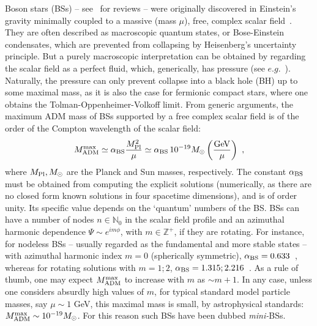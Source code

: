 Boson stars (BSs) -- see~\cite{Schunck:2003kk,Liebling:2012fv} for reviews --  were originally discovered in Einstein's gravity minimally coupled to a massive (mass $\mu$), free, complex scalar field~\cite{Kaup:1968zz,Ruffini:1969qy}. They are often described as macroscopic quantum states, or Bose-Einstein condensates, which are prevented from collapsing by Heisenberg's uncertainty principle. But a purely macroscopic interpretation can be obtained by regarding the scalar field as a perfect fluid, which, generically, has pressure (see $e.g.$~\cite{Faraoni:2012hn}). Naturally, the pressure can only prevent collapse into a black hole (BH) up to some maximal mass, as it is also the case for fermionic compact stars, where one obtains the Tolman-Oppenheimer-Volkoff limit. From generic arguments, the maximum ADM mass of BSs supported by a free complex scalar field is of the order of the Compton wavelength of the scalar field:
%
\begin{equation}
 M_{\rm ADM}^{\rm max}\simeq \alpha_{\rm BS} \frac{M_{\rm Pl}^2}{\mu}\simeq \alpha_{\rm BS} \, 10^{-19}M_\odot\left(\frac{\rm GeV}{\mu}\right)\ , 
\label{mini}
\end{equation}
 where $M_{\rm Pl},M_{\odot}$ are the Planck and Sun masses, respectively. The constant $\alpha_{\rm BS}$ must be obtained from computing the explicit solutions (numerically, as there are no closed form known solutions in four spacetime dimensions), and is of order unity. Its specific value depends on the `quantum' numbers of the BS. BSs can have a number of nodes $n\in \mathbb{N}_0$ in the scalar field profile and an azimuthal harmonic dependence $\Psi\sim e^{im\phi}$, with $m\in \mathbb{Z}^+$, if they are rotating. For instance, for nodeless BSs -- usually regarded as the fundamental and more stable states -- with azimuthal harmonic index $m=0$ (spherically symmetric), $\alpha_{\rm BS}=0.633$~\cite{Liebling:2012fv}, whereas for rotating solutions with $m=1;2$, $\alpha_{\rm BS}=1.315;2.216$~\cite{Yoshida:1997qf,Grandclement:2014msa}. As a rule of thumb, one may expect $M^{\rm max}_{\rm ADM}$  to increase with $m$ as $\sim m+1$. In any case, unless one considers absurdly high values of $m$, for typical standard model particle masses, say $\mu\sim 1$ GeV, this maximal mass is small, by astrophysical standards: $M_{\rm ADM}^{\rm max}\sim 10^{-19} M_\odot$. For this reason such BSs have been dubbed \textit{mini-}BSs. 
 
